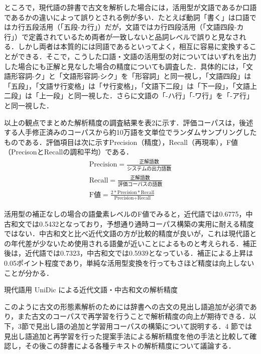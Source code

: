 \documentclass[japanese]{jnlp_1.4}
\begin{document}
ところで，現代語の辞書で古文を解析した場合には，活用型が文語であるか口語であるかの違いによって誤りとされる例が多い．たとえば動詞「書く」は口語ではカ行五段活用（「五段-カ行」）だが，文語ではカ行四段活用（「文語四段-カ行」）で定義されているため両者が一致しないと品詞レベルで誤りと見なされる．しかし両者は本質的には同語であるといってよく，相互に容易に変換することができる．そこで，こうした口語・文語の活用型の対についてはいずれを出力した場合にも正解と見なした場合の精度についても調査した．具体的には，「文語形容詞-ク」と「文語形容詞-シク」を「形容詞」と同一視し，「文語四段」は「五段」，「文語サ行変格」は「サ行変格」，「文語下二段」は「下一段」，「文語上二段」は「上一段」と同一視した．さらに文語の「-ハ行」「-ワ行」を「-ア行」と同一視した．

以上の観点でまとめた解析精度の調査結果を表2に示す．評価コーパスは，後述する人手修正済みのコーパスから約10万語を文単位でランダムサンプリングしたものである．評価項目は次に示すPrecision（精度），Recall（再現率），F値（PrecisonとRecallの調和平均）である．
\begin{gather*}
\mbox{Precision} = \frac{正解語数}{システムの出力語数} \\[1ex]
\mbox{Recall} =  \frac{正解語数}{評価コーパスの語数} \\[1ex]
\mbox{F値} = \frac{2 * \mbox{Precision} * \mbox{Recall}}{\mbox{Precision} + \mbox{Recall}} 
\end{gather*}

活用型の補正なしの場合の語彙素レベルのF値でみると，近代語では0.6775，中古和文では0.5432となっており，予想通り通時コーパス構築の実用に耐える精度ではない．中古和文と比べ近代文語の方が比較的精度が良いが，これは現代語との年代差が少ないため使用される語彙が近いことによるものと考えられる．補正後は，近代語では0.7323，中古和文では0.5939となっている．補正による上昇は0.05ポイント程度であり，単純な活用型変換を行ってもさほど精度は向上しないことが分かる．

\begin{table}[t]
\caption{現代語用 UniDic による近代文語・中古和文の解析精度}
\label{tab2}

\end{table}

このように古文の形態素解析のためには辞書への古文の見出し語追加が必須であり，また古文のコーパスで再学習を行うことで解析精度の向上が期待できる．以下，3節で見出し語の追加と学習用コーパスの構築について説明する．4 節では見出し語追加と再学習を行った提案手法による解析精度を他の手法と比較して確認し，その後この辞書による各種テキストの解析精度について議論する．
\end{document}
